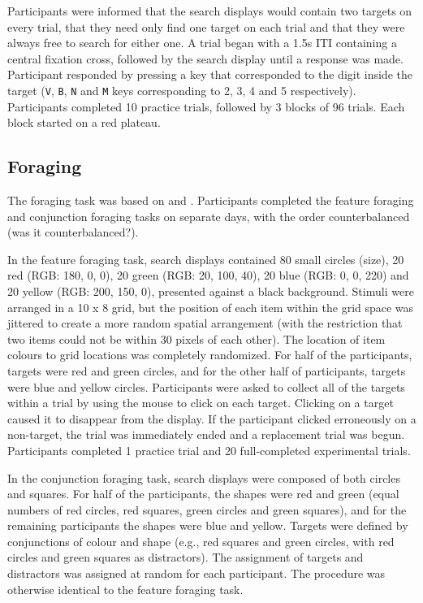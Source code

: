 \documentclass[a4paper, oneside, 11pt, onecolumn]{article}
\begin{document}
Participants were informed that the search displays would contain two targets on every trial, that they need only find one target on each trial and that they were always free to search for either one. A trial began with a 1.5s ITI containing a central fixation cross, followed by the search display until a response was made. Participant responded by pressing a key that corresponded to the digit inside the target (\texttt{V}, \texttt{B}, \texttt{N} and \texttt{M} keys corresponding to 2, 3, 4 and 5 respectively). Participants completed 10 practice trials, followed by 3 blocks of 96 trials. Each block started on a red plateau.  


\subsection{Foraging}

The foraging task was based on \cite{kristjansson2014} and \cite{johannesson2016}. Participants completed the feature foraging and conjunction foraging tasks on separate days, with the order counterbalanced (was it counterbalanced?).

In the feature foraging task, search displays contained 80 small circles (size), 20 red (RGB: 180, 0, 0), 20 green (RGB: 20, 100, 40), 20 blue (RGB: 0, 0, 220) and 20 yellow (RGB: 200, 150, 0), presented against a black background. Stimuli were arranged in a 10 x 8 grid, but the position of each item within the grid space was jittered to create a more random spatial arrangement (with the restriction that two items could not be within 30 pixels of each other). The location of item colours to grid locations was completely randomized. 
For half of the participants, targets were red and green circles, and for the other half of participants, targets were blue and yellow circles. Participants were asked to collect all of the targets within a trial by using the mouse to click on each target. Clicking on a target caused it to disappear from the display. If the participant clicked erroneously on a non-target, the trial was immediately ended and a replacement trial was begun. Participants completed 1 practice trial and 20 full-completed experimental trials.

In the conjunction foraging task, search displays were composed of both circles and squares. For half of the participants, the shapes were red and green (equal numbers of red circles, red squares, green circles and green squares), and for the remaining participants the shapes were blue and yellow. Targets were defined by conjunctions of colour and shape (e.g., red squares and green circles, with red circles and green squares as distractors). The assignment of targets and distractors was assigned at random for each participant. The procedure was otherwise identical to the feature foraging task. 
\end{document}
